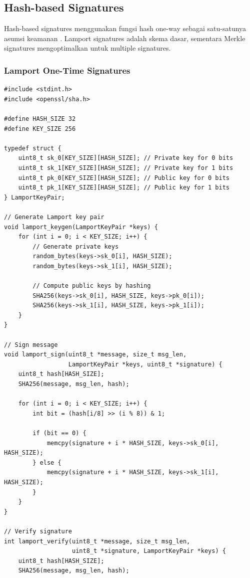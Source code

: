 \subsection{Hash-based Signatures}

Hash-based signatures menggunakan fungsi hash one-way sebagai satu-satunya asumsi keamanan \cite{merkle1979}. Lamport signatures adalah skema dasar, sementara Merkle signatures mengoptimalkan untuk multiple signatures.

\subsubsection{Lamport One-Time Signatures}

\begin{lstlisting}[style=cstyle, caption={Lamport One-Time Signature}]
#include <stdint.h>
#include <openssl/sha.h>

#define HASH_SIZE 32
#define KEY_SIZE 256

typedef struct {
    uint8_t sk_0[KEY_SIZE][HASH_SIZE]; // Private key for 0 bits
    uint8_t sk_1[KEY_SIZE][HASH_SIZE]; // Private key for 1 bits
    uint8_t pk_0[KEY_SIZE][HASH_SIZE]; // Public key for 0 bits
    uint8_t pk_1[KEY_SIZE][HASH_SIZE]; // Public key for 1 bits
} LamportKeyPair;

// Generate Lamport key pair
void lamport_keygen(LamportKeyPair *keys) {
    for (int i = 0; i < KEY_SIZE; i++) {
        // Generate private keys
        random_bytes(keys->sk_0[i], HASH_SIZE);
        random_bytes(keys->sk_1[i], HASH_SIZE);
        
        // Compute public keys by hashing
        SHA256(keys->sk_0[i], HASH_SIZE, keys->pk_0[i]);
        SHA256(keys->sk_1[i], HASH_SIZE, keys->pk_1[i]);
    }
}

// Sign message
void lamport_sign(uint8_t *message, size_t msg_len, 
                  LamportKeyPair *keys, uint8_t *signature) {
    uint8_t hash[HASH_SIZE];
    SHA256(message, msg_len, hash);
    
    for (int i = 0; i < KEY_SIZE; i++) {
        int bit = (hash[i/8] >> (i % 8)) & 1;
        
        if (bit == 0) {
            memcpy(signature + i * HASH_SIZE, keys->sk_0[i], HASH_SIZE);
        } else {
            memcpy(signature + i * HASH_SIZE, keys->sk_1[i], HASH_SIZE);
        }
    }
}

// Verify signature
int lamport_verify(uint8_t *message, size_t msg_len, 
                   uint8_t *signature, LamportKeyPair *keys) {
    uint8_t hash[HASH_SIZE];
    SHA256(message, msg_len, hash);
    

\end{lstlisting}
